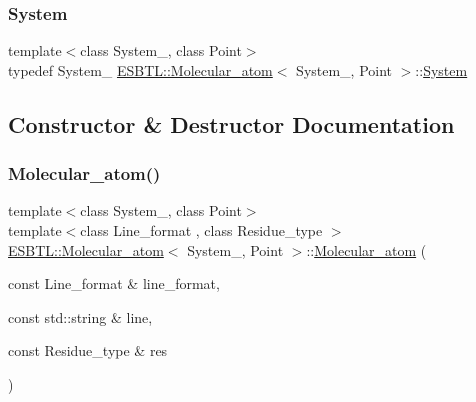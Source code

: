 \mbox{\label{classESBTL_1_1Molecular__atom_a58dc16da7581815290469a77906ff8f2}} 
\subsubsection{\texorpdfstring{System}{System}}
{\footnotesize\ttfamily template$<$class System\+\_\+, class Point$>$ \\
typedef System\+\_\+ \hyperlink{classESBTL_1_1Molecular__atom}{E\+S\+B\+T\+L\+::\+Molecular\+\_\+atom}$<$ System\+\_\+, Point $>$\+::\hyperlink{classESBTL_1_1Molecular__atom_a58dc16da7581815290469a77906ff8f2}{System}}



\subsection{Constructor \& Destructor Documentation}
\mbox{\label{classESBTL_1_1Molecular__atom_ac32221d9e98536591fae017386cd4d82}} 
\subsubsection{\texorpdfstring{Molecular\+\_\+atom()}{Molecular\_atom()}\hspace{0.1cm}{\footnotesize\ttfamily [1/3]}}
{\footnotesize\ttfamily template$<$class System\+\_\+, class Point$>$ \\
template$<$class Line\+\_\+format , class Residue\+\_\+type $>$ \\
\hyperlink{classESBTL_1_1Molecular__atom}{E\+S\+B\+T\+L\+::\+Molecular\+\_\+atom}$<$ System\+\_\+, Point $>$\+::\hyperlink{classESBTL_1_1Molecular__atom}{Molecular\+\_\+atom} (\begin{DoxyParamCaption}\item[{const Line\+\_\+format \&}]{line\+\_\+format,  }\item[{const std\+::string \&}]{line,  }\item[{const Residue\+\_\+type \&}]{res }\end{DoxyParamCaption})\hspace{0.3cm}{\ttfamily [inline]}}

